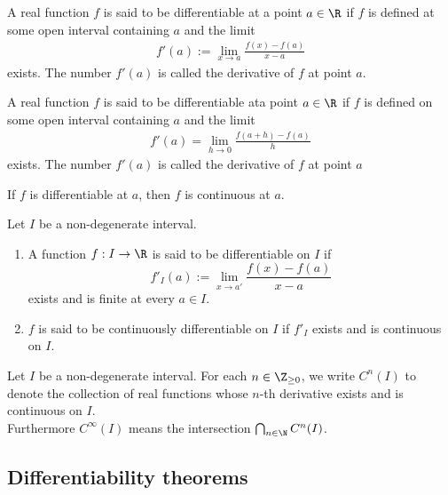 \documentclass{article}
\begin{document}
\begin{definition}[Ross, 28.1]
    A real function $f$ is said to be differentiable at a
    point $a\in\R$ if $f$ is defined at some open interval containing
    $a$ and the limit
    \begin{align*}
        f'(a) := \lim_{x\to a}\frac{f(x)-f(a)}{x-a}
    \end{align*}
    exists. The number $f'(a)$ is called the derivative of $f$
    at point $a$.
\end{definition}

\begin{definition}
    A real function $f$ is said to be differentiable ata point $a\in\R$
    if $f$ is defined on some open interval containing $a$ and the
    limit
    \begin{align*}
        f'(a)=\lim_{h\to 0}\frac{f(a+h)-f(a)}{h}
    \end{align*}
    exists. The number $f'(a)$ is called the derivative of $f$
    at point $a$
\end{definition}

\begin{theorem}[Ross, 28.2]
    If $f$ is differentiable at $a$, then $f$ is continuous at $a$.
\end{theorem}

\begin{definition}
    Let $I$ be a non-degenerate interval.
    \begin{enumerate}[label=(\arabic*)]
        \item A function $f:I\to\R$ is said to be differentiable on $I$
              if \[f'_I(a):= \lim_{x\to a'}\frac{f(x)-f(a)}{x-a}\] exists and is
              finite at every $a\in I$.
        \item $f$ is said to be continuously differentiable on $I$ if $f'_I$
              exists and is continuous on $I$.
    \end{enumerate}
\end{definition}

\begin{definition*}
    Let $I$ be a non-degenerate interval. For each $n\in\Z_{\geq 0}$, we write
    $C^n(I)$ to denote the collection of real functions whose $n$-th derivative
    exists and is continuous on $I$.\\
    \indent
    Furthermore $C^\infty(I)$ means the intersection $\bigcap_{n\in\N}C^n(I)$.
\end{definition*}

\subsection{Differentiability theorems}
\end{document}

